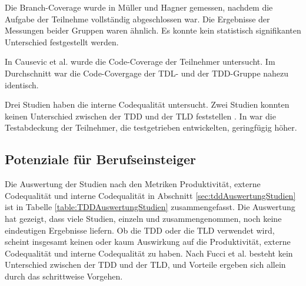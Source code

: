 Die Branch-Coverage wurde in Müller und Hagner \cite{Muller2002ExperimentProgramming} gemessen, nachdem die Aufgabe der Teilnehme vollständig abgeschlossen war. Die Ergebnisse der Messungen beider Gruppen waren ähnlich. Es konnte kein statistisch signifikanten Unterschied festgestellt werden.

In Causevic et al. \cite{Causevic2012TestExperiment} wurde die Code-Coverage der Teilnehmer untersucht. Im Durchschnitt war die Code-Covergage der TDL- und der TDD-Gruppe nahezu identisch.

Drei Studien haben die interne Codequalität untersucht. Zwei Studien konnten keinen Unterschied zwischen der TDD und der TLD feststellen \cite{Muller2002ExperimentProgramming,Causevic2012TestExperiment}. In \cite{Madeyski2010TheExperiment} war die Testabdeckung der Teilnehmer, die testgetrieben entwickelten, geringfügig höher.

\subsection{Potenziale für Berufseinsteiger} \label{sec:TDDPotenzial}

Die Auswertung der Studien nach den Metriken Produktivität, externe Codequalität und interne Codequalität in Abschnitt \ref{sec:tddAuswertungStudien} ist in Tabelle \ref{table:TDDAuswertungStudien} zusammengefasst. Die Auswertung hat gezeigt, dass viele Studien, einzeln und zusammengenommen, noch keine eindeutigen Ergebnisse liefern. Ob die TDD oder die TLD verwendet wird, scheint insgesamt keinen oder kaum Auswirkung auf die Produktivität, externe Codequalität und interne Codequalität zu haben. Nach Fucci et al. \cite{Fucci2016ATest-Last} besteht kein Unterschied zwischen der TDD und der TLD, und Vorteile ergeben sich allein durch das schrittweise Vorgehen.

